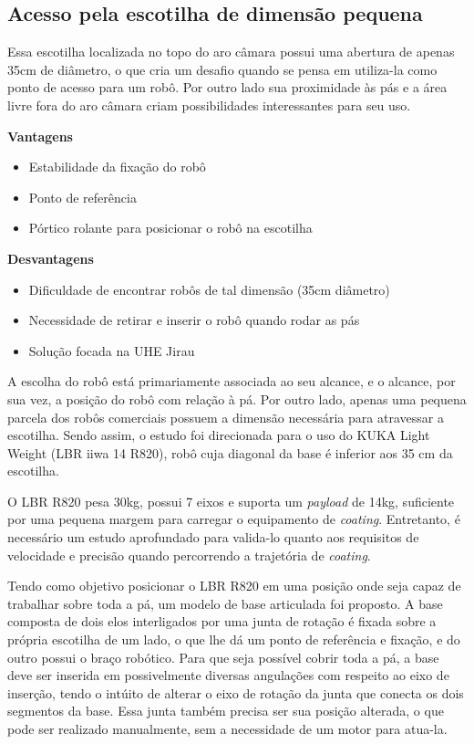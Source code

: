 \subsection{Acesso pela escotilha de dimensão pequena}

Essa escotilha localizada no topo do aro câmara possui uma abertura de apenas
35cm de diâmetro, o que cria um desafio quando se pensa em utiliza-la como ponto
de acesso para um robô. Por outro lado sua proximidade às pás e a área livre fora do aro
câmara criam possibilidades interessantes para seu uso.

\textbf{Vantagens}
\begin{itemize}
  \item Estabilidade da fixação do robô
  \item Ponto de referência
  \item Pórtico rolante para posicionar o robô na escotilha
\end{itemize}

\textbf{Desvantagens}
\begin{itemize}
  \item Dificuldade de encontrar robôs de tal dimensão (35cm diâmetro)
  \item Necessidade de retirar e inserir o robô quando rodar as pás
  \item Solução focada na UHE Jirau
\end{itemize}

A escolha do robô está primariamente associada ao seu alcance, e o alcance, por
sua vez, a posição do robô com relação à pá. Por outro lado, apenas uma pequena
parcela dos robôs comerciais possuem a dimensão necessária para atravessar a
escotilha. Sendo assim, o estudo foi direcionada para o uso do KUKA Light Weight
(LBR iiwa 14 R820), robô cuja diagonal da base é inferior aos 35 cm da
escotilha.

O LBR R820 pesa 30kg, possui 7 eixos e suporta um \textit{payload} de 14kg,
suficiente por uma pequena margem para carregar o equipamento de
\textit{coating}. Entretanto, é necessário um estudo aprofundado para valida-lo
quanto aos requisitos de velocidade e precisão quando percorrendo a trajetória
de \textit{coating}.

Tendo como objetivo posicionar o LBR R820 em uma posição onde seja capaz de
trabalhar sobre toda a pá, um modelo de base articulada foi proposto. A base
composta de dois elos interligados por uma junta de rotação é fixada sobre a
própria escotilha de um lado, o que lhe dá um ponto de referência e fixação, e
do outro possui o braço robótico. Para que seja possível cobrir toda a pá,
a base deve ser inserida em possivelmente diversas angulações com respeito ao
eixo de inserção, tendo o intúito de alterar o eixo de rotação da junta que
conecta os dois segmentos da base. Essa junta também precisa ser sua posição
alterada, o que pode ser realizado manualmente, sem a necessidade de um motor
para atua-la.

